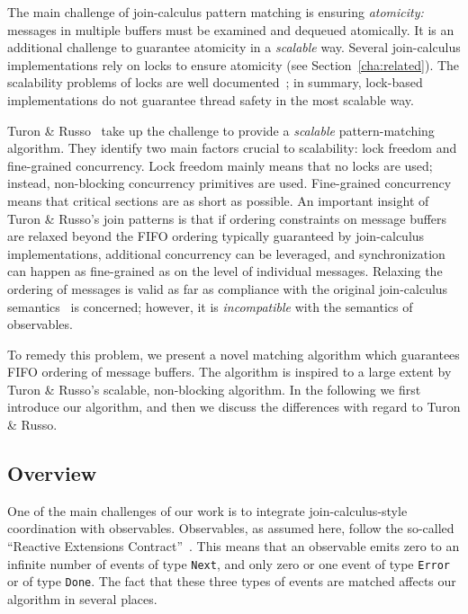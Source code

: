 \documentclass[runningheads]{llncs}
\begin{document}
\begin{sloppypar}
The main challenge of join-calculus pattern matching is ensuring {\em
atomicity:} messages in multiple buffers must be examined and dequeued
atomically. It is an additional challenge to guarantee atomicity in a {\em scalable}
way. Several join-calculus implementations rely on locks to ensure atomicity
(see Section~\ref{cha:related}). The scalability problems of locks are well
documented~\cite{Michael:1998}; in summary, lock-based implementations do not
guarantee thread safety in the most scalable way.

Turon \& Russo~\cite{Turon:2011} take up the challenge to provide a {\em
scalable} pattern-matching algorithm. They identify two main factors crucial
to scalability: lock freedom and fine-grained concurrency. Lock freedom mainly
means that no locks are used; instead, non-blocking concurrency primitives are
used. Fine-grained concurrency means that critical sections are as short as
possible. An important insight of Turon \& Russo's join patterns is that if
ordering constraints on message buffers are relaxed beyond the FIFO ordering
typically guaranteed by join-calculus implementations, additional concurrency
can be leveraged, and synchronization can happen as fine-grained as on the
level of individual messages. Relaxing the ordering of messages is valid as
far as compliance with the original join-calculus
semantics~\cite{Fournet:1996} is concerned; however, it is {\em incompatible}
with the semantics of observables.

To remedy this problem, we present a novel matching algorithm which guarantees
FIFO ordering of message buffers. The algorithm is inspired to a large extent
by Turon \& Russo's scalable, non-blocking algorithm. In the following we
first introduce our algorithm, and then we discuss the differences with regard
to Turon \& Russo.


\subsection{Overview}

One of the main challenges of our work is to integrate join-calculus-style
coordination with observables. Observables, as assumed here, follow the
so-called ``Reactive Extensions Contract''~\cite{RxContract:2010}. This means
that an observable emits zero to an infinite number of events of type
\verb|Next|, and only zero or one event of type \verb|Error| or of type
\verb|Done|. The fact that these three types of events are matched affects
our algorithm in several places.


\end{sloppypar}
\end{document}
